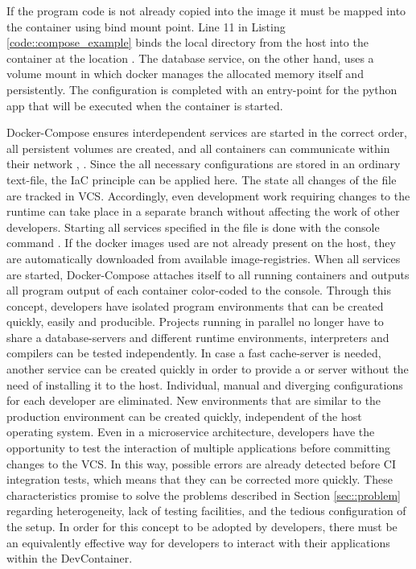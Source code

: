        If the program code is not already copied into the image it must be mapped into the container using bind mount point. Line 11 in Listing \ref{code::compose_example} binds the local  directory from the host into the container at the location . The database service, on the other hand, uses a volume mount in which docker manages the allocated memory itself and persistently. The configuration is completed with an entry-point for the python app that will be executed when the container is started.\newline
        
        Docker-Compose ensures interdependent services are started in the correct order, all persistent volumes are created, and all containers can communicate within their network \cite{docker2020}, \cite{dockerdocs}. Since the all necessary configurations are stored in an ordinary text-file, the \ac{IaC} principle can be applied here. The state all changes of the  file are tracked in \ac{VCS}. Accordingly, even development work requiring changes to the runtime can take place in a separate branch without affecting the work of other developers.\newline
        Starting all services specified in the  file is done with the console command . If the docker images used are not already present on the host, they are automatically downloaded from available image-registries. When all services are started, Docker-Compose attaches itself to all running containers and outputs all program output of each container color-coded to the console.\newline
        Through this concept, developers have isolated program environments that can be created quickly, easily and producible. Projects running in parallel no longer have to share a database-servers and different runtime environments, interpreters and compilers can be tested independently. In case a fast cache-server is needed, another service can be created quickly in order to provide a  or  server without the need of installing it to the host. Individual, manual and diverging configurations for each developer are eliminated. New environments that are similar to the production environment can be created quickly, independent of the host operating system. Even in a microservice architecture, developers have the opportunity to test the interaction of multiple applications before committing changes to the \ac{VCS}. In this way, possible errors are already detected before CI integration tests, which means that they can be corrected more quickly. These characteristics promise to solve the problems described in Section \ref{sec::problem} regarding heterogeneity, lack of testing facilities, and the tedious configuration of the setup. In order for this concept to be adopted by developers, there must be an equivalently effective way for developers to interact with their applications within the DevContainer.

